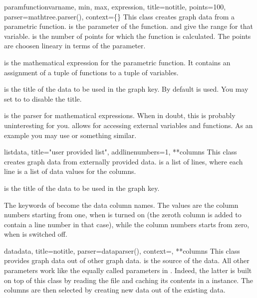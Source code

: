 \begin{classdesc}{paramfunction}{varname, min, max, expression, %
                                 title=notitle, points=100,
                                 parser=mathtree.parser(),
                                 context=\{\}}
  This class creates graph data from a parametric function.
   is the parameter of the function.  and
   give the range for that variable.  is the
  number of points for which the function is calculated. The points
  are choosen lineary in terms of the parameter.

   is the mathematical expression for the parametric
  function. It contains an assignment of a tuple of functions to a
  tuple of variables.

   is the title of the data to be used in the graph key. By
  default  is used. You may set  to
   to disable the title.

   is the parser for mathematical expressions. When in
  doubt, this is probably uninteresting for you.  allows
  for accessing external variables and functions. As an example you
  may use  or something similar.
\end{classdesc} %

\begin{classdesc}{list}{data, title="user provided list", %
                        addlinenumbers=1, **columns}
  This class creates graph data from externally provided data.
   is a list of lines, where each line is a list of data
  values for the columns.

   is the title of the data to be used in the graph key.

  The keywords of  become the data column names. The
  values are the column numbers starting from one, when
   is turned on (the zeroth column is added to
  contain a line number in that case), while the column numbers starts
  from zero, when  is switched off.
\end{classdesc} %

\begin{classdesc}{data}{data, title=notitle, parser=dataparser(), %
                        context={}, **columns}
  This class provides graph data out of other graph data. 
  is the source of the data. All other parameters work like the equally
  called parameters in . Indeed, the latter is
  built on top of this class by reading the file and caching its
  contents in a  instance. The columns are then
  selected by creating new data out of the existing data.
\end{classdesc} %


